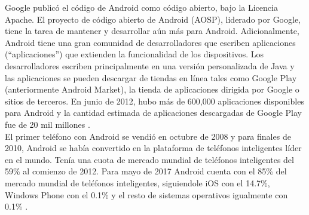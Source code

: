 Google publicó el código de Android como código abierto, bajo la Licencia Apache. El proyecto de código abierto de Android (AOSP), liderado por Google, tiene la tarea de mantener y desarrollar aún más para Android. Adicionalmente, Android tiene una gran comunidad de desarrolladores que escriben aplicaciones (``aplicaciones'') que extienden la funcionalidad de los dispositivos. Los desarrolladores escriben principalmente en una versión personalizada de Java y las aplicaciones se pueden descargar de tiendas en línea tales como Google Play (anteriormente Android Market), la tienda de aplicaciones dirigida por Google o sitios de terceros. En junio de 2012, hubo más de 600,000 aplicaciones disponibles para Android y la cantidad estimada de aplicaciones descargadas de Google Play fue de 20 mil millones \cite{MBPDO}. \\

El primer teléfono con Android se vendió en octubre de 2008 y para finales de 2010, Android se había convertido en la plataforma de teléfonos inteligentes líder en el mundo. Tenía una cuota de mercado mundial de teléfonos inteligentes del 59\% al comienzo de 2012. Para mayo de 2017 Android cuenta con el 85\% del mercado mundial de teléfonos inteligentes, siguiendole iOS con el 14.7\%, Windows Phone con el 0.1\% y el resto de sistemas operativos igualmente con 0.1\% \cite{MBAND}. \\

